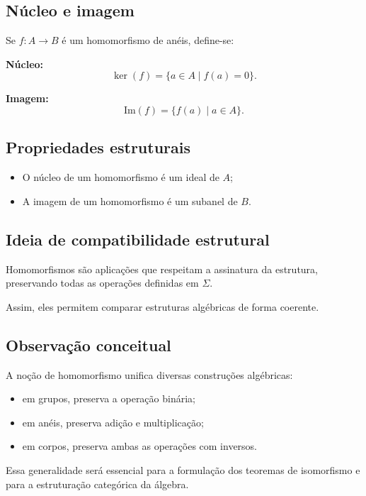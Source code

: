 \documentclass[../../main]{subfiles}
\begin{document}
\subsection{Núcleo e imagem}

Se $f : A \to B$ é um homomorfismo de anéis, define-se:

\textbf{Núcleo:}
\[
	\ker(f) = \{a \in A \mid f(a) = 0\}.
\]

\textbf{Imagem:}
\[
	\mathrm{Im}(f) = \{f(a) \mid a \in A\}.
\]

\subsection{Propriedades estruturais}

\begin{itemize}
	\item O núcleo de um homomorfismo é um ideal de $A$;
	\item A imagem de um homomorfismo é um subanel de $B$.
\end{itemize}

\subsection{Ideia de compatibilidade estrutural}

Homomorfismos são aplicações que respeitam a assinatura da estrutura, preservando todas as operações definidas em $\Sigma$.

Assim, eles permitem comparar estruturas algébricas de forma coerente.

\subsection{Observação conceitual}

A noção de homomorfismo unifica diversas construções algébricas:

\begin{itemize}
	\item em grupos, preserva a operação binária;
	\item em anéis, preserva adição e multiplicação;
	\item em corpos, preserva ambas as operações com inversos.
\end{itemize}

Essa generalidade será essencial para a formulação dos teoremas de isomorfismo e para a estruturação categórica da álgebra.
\end{document}
